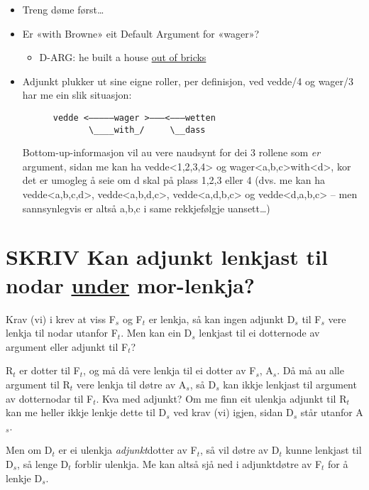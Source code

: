 \documentclass[11pt,a4paper,oneside,draft]{book}
\begin{document}
\begin{itemize}
\item Treng døme først\ldots{}
\item Er «with Browne» eit Default Argument for «wager»?

\begin{itemize}
\item D-ARG: he built a house \underline{out of bricks}
\end{itemize}

\item Adjunkt plukker ut sine eigne roller, per definisjon, ved
     vedde/4 og wager/3 har me ein slik situasjon:
\begin{verbatim}
      vedde <—————wager >———<———wetten
             \____with_/     \__dass
\end{verbatim}

     Bottom-up-informasjon vil au vere naudsynt for dei 3 rollene
     som \emph{er} argument, sidan me kan ha vedde<1,2,3,4> og
     wager<a,b,c>with<d>, kor det er umogleg å seie om d skal på plass
     1,2,3 eller 4 (dvs. me kan ha vedde<a,b,c,d>, vedde<a,b,d,c>,
     vedde<a,d,b,c> og vedde<d,a,b,c> -- men sannsynlegvis er altså
     a,b,c i same rekkjefølgje uansett\ldots{})
\end{itemize}
\section{\textbf{SKRIV} Kan adjunkt lenkjast til nodar \underline{under} mor-lenkja?}
\label{sec-3.13}

\label{SEC:merge-daughters}

Krav (vi) i \citet[s.~75]{dyvik2009lmp} krev at viss F$_s$ og F$_t$ er
lenkja, så kan ingen adjunkt D$_s$ til F$_s$ vere lenkja til nodar utanfor
F$_t$. Men kan ein D$_s$ lenkjast til ei dotternode av argument eller
adjunkt til F$_t$?

R$_t$ er dotter til F$_t$, og må då vere lenkja til ei dotter av F$_s$,
A$_s$. Då må au alle argument til R$_t$ vere lenkja til døtre av A$_s$, så
D$_s$ kan ikkje lenkjast til argument av dotternodar til F$_t$. Kva med
adjunkt? Om me finn eit ulenkja adjunkt til R$_t$ kan me heller ikkje
lenkje dette til D$_s$ ved krav (vi) igjen, sidan D$_s$ står utanfor
A$_s$.

Men om D$_t$ er ei ulenkja \emph{adjunkt}dotter av F$_t$, så vil døtre av
D$_t$ kunne lenkjast til D$_s$, så lenge D$_t$ forblir ulenkja. Me kan altså
sjå ned i adjunktdøtre av F$_t$ for å lenkje D$_s$. 
\end{document}
